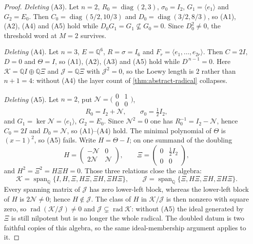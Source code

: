 \documentclass[11pt,reqno]{amsart}
\theoremstyle{plain}
\theoremstyle{definition}
\theoremstyle{remark}
\numberwithin{equation}{section}
\begin{document}
\begin{proof}
\emph{Deleting} (A3). Let $n=2$, $R_{0}=\operatorname{diag}(2,3)$,
$\sigma_{0}=I_{2}$, $G_{1}=\langle e_{1}\rangle$ and $G_{2}=E_{0}$. Then
$C_{0}=\operatorname{diag}(5/2,10/3)$ and
$D_{0}=\operatorname{diag}(3/2,8/3)$, so (A1), (A2), (A4) and (A5) hold while
$D_{0}G_{1}=G_{1}\not\subseteq G_{0}=0$. Since $D_{0}^{2}\ne0$, the threshold
word at $M=2$ survives.

\emph{Deleting} (A4). Let $n=3$, $E=\mathbb{Q}^{6}$, $R=\sigma=I_{6}$ and
$F_{r}=\langle e_{1},\dots,e_{2r}\rangle$. Then $C=2I$, $D=0$ and
$\Theta=I$, so (A1), (A2), (A3) and (A5) hold while $D^{\,n-1}=0$. Here
$\mathcal{K}=\mathbb{Q}I\oplus\mathbb{Q}\Xi$ and
$\mathcal{J}=\mathbb{Q}\Xi$ with $\mathcal{J}^{2}=0$, so the Loewy length is
$2$ rather than $n+1=4$: without (A4) the layer count of
\cref{thm:abstract-radical} collapses.

\emph{Deleting} (A5). Let $n=2$, put
$\mathcal{N}=\bigl(\begin{smallmatrix}0&1\\0&0\end{smallmatrix}\bigr)$,
\begin{equation*}
  R_{0}=I_{2}+\mathcal{N},
  \qquad
  \sigma_{0}=\tfrac12 I_{2},
\end{equation*}
and $G_{1}=\ker\mathcal{N}=\langle e_{1}\rangle$, $G_{2}=E_{0}$. Since
$\mathcal{N}^{2}=0$ one has $R_{0}^{-1}=I_{2}-\mathcal{N}$, hence $C_{0}=2I$
and $D_{0}=\mathcal{N}$, so (A1)--(A4) hold. The minimal polynomial of
$\Theta$ is $(x-1)^{2}$, so (A5) fails. Write $H=\Theta-I$; on one summand of
the doubling
\begin{equation*}
  H=\begin{pmatrix}-\mathcal{N}&0\\2\mathcal{N}&\mathcal{N}\end{pmatrix},
  \qquad
  \Xi=\begin{pmatrix}0&\tfrac12 I_{2}\\0&0\end{pmatrix},
\end{equation*}
and $H^{2}=\Xi^{2}=H\Xi H=0$. Those three relations close the algebra:
\begin{equation*}
  \mathcal{K}=\operatorname{span}_{\mathbb{Q}}\{I,H,\Xi,H\Xi,\Xi H,\Xi H\Xi\},
  \qquad
  \mathcal{J}=\operatorname{span}_{\mathbb{Q}}\{\Xi,H\Xi,\Xi H,\Xi H\Xi\}.
\end{equation*}
Every spanning matrix of $\mathcal{J}$ has zero lower-left block, whereas the
lower-left block of $H$ is $2\mathcal{N}\ne0$; hence $H\notin\mathcal{J}$. The
class of $H$ in $\mathcal{K}/\mathcal{J}$ is then nonzero with square zero, so
$\operatorname{rad}(\mathcal{K}/\mathcal{J})\ne0$ and
$\mathcal{J}\subsetneq\operatorname{rad}\mathcal{K}$: without (A5) the ideal
generated by $\Xi$ is still nilpotent but is no longer the whole radical. The
doubled datum is two faithful copies of this algebra, so the same
ideal-membership argument applies to it.
\end{proof}
\end{document}
